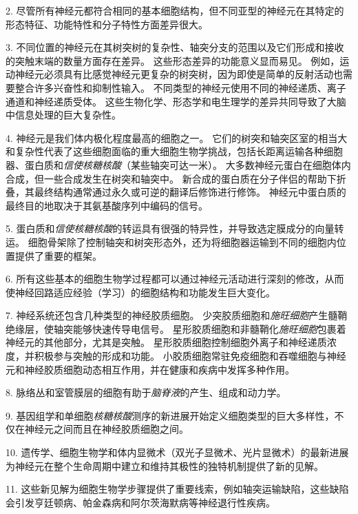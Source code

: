 2. 尽管所有神经元都符合相同的基本细胞结构，但不同亚型的神经元在其特定的形态特征、功能特性和分子特性方面差异很大。


3. 不同位置的神经元在其树突树的复杂性、轴突分支的范围以及它们形成和接收的突触末端的数量方面存在差异。
这些形态差异的功能意义显而易见。
例如，运动神经元必须具有比感觉神经元更复杂的树突树，因为即使是简单的反射活动也需要整合许多兴奋性和抑制性输入。
不同类型的神经元使用不同的神经递质、离子通道和神经递质受体。
这些生物化学、形态学和电生理学的差异共同导致了大脑中信息处理的巨大复杂性。


4. 神经元是我们体内极化程度最高的细胞之一。
它们的树突和轴突区室的相当大和复杂性代表了这些细胞面临的重大细胞生物学挑战，包括长距离运输各种细胞器、蛋白质和\textit{信使核糖核酸}（某些轴突可达一米）。
大多数神经元蛋白在细胞体内合成，但一些合成发生在树突和轴突中。
新合成的蛋白质在分子伴侣的帮助下折叠，其最终结构通常通过永久或可逆的翻译后修饰进行修饰。
神经元中蛋白质的最终目的地取决于其氨基酸序列中编码的信号。


5. 蛋白质和\textit{信使核糖核酸}的转运具有很强的特异性，并导致选定膜成分的向量转运。
细胞骨架除了控制轴突和树突形态外，还为将细胞器运输到不同的细胞内位置提供了重要的框架。


6. 所有这些基本的细胞生物学过程都可以通过神经元活动进行深刻的修改，从而使神经回路适应经验（学习）的细胞结构和功能发生巨大变化。


7. 神经系统还包含几种类型的神经胶质细胞。
少突胶质细胞和\textit{施旺细胞}产生髓鞘绝缘层，使轴突能够快速传导电信号。
星形胶质细胞和非髓鞘化\textit{施旺细胞}包裹着神经元的其他部分，尤其是突触。 
星形胶质细胞控制细胞外离子和神经递质浓度，并积极参与突触的形成和功能。
小胶质细胞常驻免疫细胞和吞噬细胞与神经元和神经胶质细胞动态相互作用，并在健康和疾病中发挥多种作用。


8. 脉络丛和室管膜层的细胞有助于\textit{脑脊液}的产生、组成和动力学。


9. 基因组学和单细胞\textit{核糖核酸}测序的新进展开始定义细胞类型的巨大多样性，不仅在神经元之间而且在神经胶质细胞之间。


10. 遗传学、细胞生物学和体内显微术（双光子显微术、光片显微术）的最新进展为神经元在整个生命周期中建立和维持其极性的独特机制提供了新的见解。


11. 这些新见解为细胞生物学步骤提供了重要线索，例如轴突运输缺陷，这些缺陷会引发亨廷顿病、帕金森病和阿尔茨海默病等神经退行性疾病。



